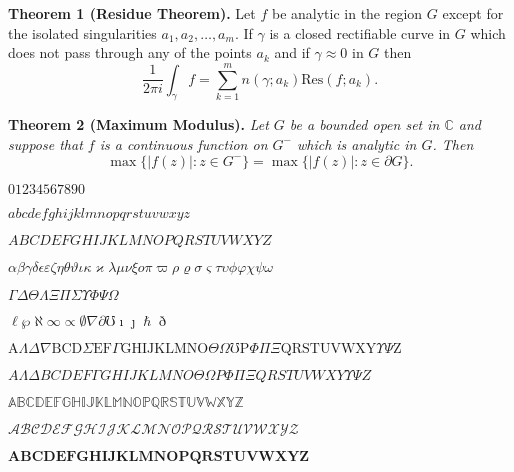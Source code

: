 
\noindent\textbf{Theorem 1 (Residue Theorem).}
Let $f$ be analytic in the region $G$ except for the isolated singularities $a_1,a_2,\ldots,a_m$. If $\gamma$ is a closed rectifiable curve in $G$ which does not pass through any of the points $a_k$ and if $\gamma\approx 0$ in $G$ then
\[
\frac{1}{2\pi i}\int_\gamma f = \sum_{k=1}^m n(\gamma;a_k) \text{Res}(f;a_k).
\]

\noindent\textbf{Theorem 2 (Maximum Modulus).}
\emph{Let $G$ be a bounded open set in $\mathbb{C}$ and suppose that $f$ is a continuous function on $G^-$ which is analytic in $G$. Then}
\[
\max\{|f(z)|:z\in G^-\}=\max \{|f(z)|:z\in \partial G \}.
\]

\vspace*{20pt}

\newcommand{\abc}{abcdefghijklmnopqrstuvwxyz}
\newcommand{\ABC}{ABCDEFGHIJKLMNOPQRSTUVWXYZ}
\newcommand{\alphabeta}{\alpha\beta\gamma\delta\epsilon\varepsilon\zeta\eta\theta\vartheta\iota\kappa\varkappa\lambda\mu\nu\xi o\pi\varpi\rho\varrho\sigma\varsigma\tau\upsilon\phi\varphi\chi\psi\omega}
\newcommand{\AlphaBeta}{\Gamma\Delta\Theta\Lambda\Xi\Pi\Sigma\Upsilon\Phi\Psi\Omega}

\small

\noindent$01234567890$

\noindent$\abc$

\noindent$\ABC$

\noindent$\alphabeta$

\noindent$\AlphaBeta$

\noindent$\ell\wp\aleph\infty\propto\emptyset\nabla\partial\mho\imath\jmath\hslash\eth$

\noindent$\mathrm{A} \Lambda \Delta \nabla \mathrm{B C D} \Sigma \mathrm{E F} \Gamma \mathrm{G H I J K L M N O} \Theta \Omega \mho \mathrm{P} \Phi \Pi \Xi \mathrm{Q R S T U V W X Y} \Upsilon \Psi \mathrm{Z} $ %

\noindent$\mathit{A \Lambda \Delta B C D E F \Gamma G H I J K L M N O \Theta \Omega P \Phi \Pi \Xi Q R S T U V W X Y \Upsilon \Psi Z }$


\noindent$\mathbb{\ABC}$

\noindent$\mathcal{\ABC}$

\noindent$\symbf{\ABC}$


